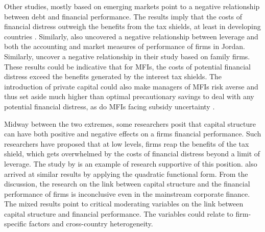 \documentclass[a4paper, nobind]{templates/ociamthesis}
\begin{document}
Other studies, mostly based on emerging markets point to a negative relationship between debt and financial performance. The results imply that the costs of financial distress outweigh the benefits from the tax shields, at least in developing countries \autocite{le2017capital}. Similarly, \textcite{zeitun2014capital} also uncovered a negative relationship between leverage and both the accounting and market measures of performance of firms in Jordan. Similarly, \textcite{hamid2015capital} uncover a negative relationship in their study based on family firms. These results could be indicative that for MFIs, the costs of potential financial distress exceed the benefits generated by the interest tax shields. The introduction of private capital could also make managers of MFIs risk averse and thus set aside much higher than optimal precautionary savings to deal with any potential financial distress, as do MFIs facing subsidy uncertainty \autocite{armendariz2013subsidy}.

Midway between the two extremes, some researchers posit that capital structure can have both positive and negative effects on a firms financial performance. Such researchers have proposed that at low levels, firms reap the benefits of the tax shield, which gets overwhelmed by the costs of financial distress beyond a limit of leverage. The study by \textcite{lin2011does} is an example of research supportive of this position. \textcite{margaritis2007capital} also arrived at similar results by applying the quadratic functional form. From the discussion, the research on the link between capital structure and the financial performance of firms is inconclusive even in the mainstream corporate finance. The mixed results point to critical moderating variables on the link between capital structure and financial performance. The variables could relate to firm-specific factors and cross-country heterogeneity.
\end{document}
